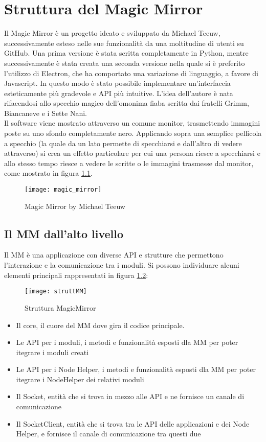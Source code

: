 \chapter{Struttura del Magic Mirror}

Il Magic Mirror \`e un progetto ideato e sviluppato da Michael Teeuw, successivamente esteso nelle sue funzionalit\`a da una moltitudine di utenti su GitHub.
Una prima versione \`e stata scritta completamente in Python, mentre successivamente \`e stata creata una seconda versione nella quale si \`e preferito l'utilizzo di Electron,
che ha comportato una variazione di linguaggio, a favore di Javascript. In questo modo \`e stato possibile implementare un'interfaccia esteticamente pi\`u gradevole
e API pi\`u intuitive.
L'idea dell'autore \`e nata rifacendosi allo specchio magico dell'omonima fiaba
scritta dai fratelli Grimm, Biancaneve e i Sette Nani.\\
Il software viene mostrato attraverso un
comune monitor, trasmettendo immagini poste su uno sfondo completamente nero. Applicando sopra
una semplice pellicola a specchio (la quale da un lato permette di specchiarsi e dall'altro di vedere
attraverso) si crea un effetto particolare per cui una persona riesce a specchiarsi
e allo stesso tempo riesce a vedere le scritte o le immagini trasmesse dal monitor,
come mostrato in figura \ref{fig:MM}.
\\[2\baselineskip]
\begin{figure}[H]
    \texttt{[image: magic\_mirror]}
    \caption{Magic Mirror by Michael Teeuw}
    \label{fig:MM}
\end{figure}

\section{Il MM dall'alto livello}
Il MM è una applicazione con diverse API e strutture che permettono l'interazione e la comunicazione tra i moduli.
Si possono individuare alcuni elementi principali rappresentati in figura \ref{fig:struttMM}:
\begin{figure}[H]
    \texttt{[image: struttMM]}
    \caption{Struttura MagicMirror}
    \label{fig:struttMM}
\end{figure}
\begin{itemize}
\item Il core, il cuore del MM dove gira il codice principale.
\item Le API per i moduli, i metodi e funzionalità esposti dla MM per poter itegrare i moduli creati
\item Le API per i Node Helper, i metodi e funzionalità esposti dla MM per poter itegrare i NodeHelper
dei relativi moduli
\item Il Socket, entità che si trova in mezzo alle API e ne fornisce un canale di comunicazione
\item Il SocketClient, entità che si trova tra le API delle applicazioni e dei Node Helper, e fornisce il canale
di comunicazione tra questi due\\[2\baselineskip]
\end{itemize}

